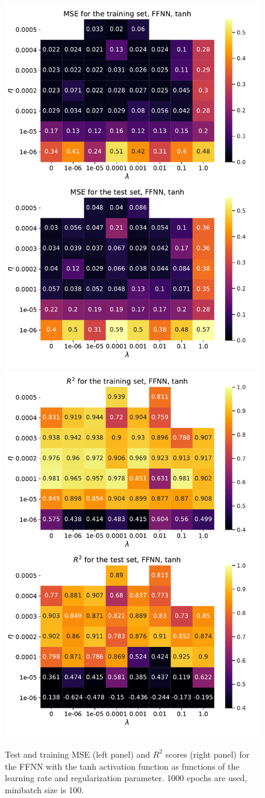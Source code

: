 \documentclass[numberedappendix, twocolappendix]{emulateapj}
\begin{document}
\begin{figure}[!htb]
    \centering
    \includegraphics[width=.49\textwidth]{Figures/NN_tanh_MSE.pdf}
    \includegraphics[width=.49\textwidth]{Figures/NN_tanh_R2.pdf}
    \caption{Test and training MSE (left panel) and $R^2$ scores (right panel) for the FFNN with the tanh activation function as functions of the learning rate and regularization parameter. 1000 epochs are used, minibatch size is 100.}
    \label{fig: FFNN+tanh scores}
\end{figure}
\end{document}
